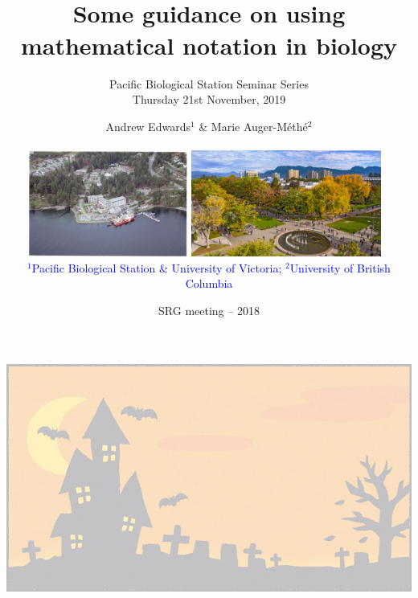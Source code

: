 


\title[Notation]{~\\ Some guidance on using mathematical notation in biology}
\author{Andrew Edwards$^1$ \& Marie Auger-M\'eth\'e$^2$
  \\ ~\\
  \includegraphics[height=3.5cm]{images/pbs.png}
  \includegraphics[height=3.5cm]{images/ubc-aerial.jpg}
  ~\\ \textcolor{blue}{$^1$Pacific Biological Station \& University of Victoria;
  $^2$University of British Columbia}}
\date{{\footnotesize SRG meeting -- 2018}}
\subtitle{\small Pacific Biological Station Seminar Series\\
Thursday 21st November, 2019}

{\includegraphics[width=\paperwidth,height=\paperheight,keepaspectratio]{images/background-trans.png}}

